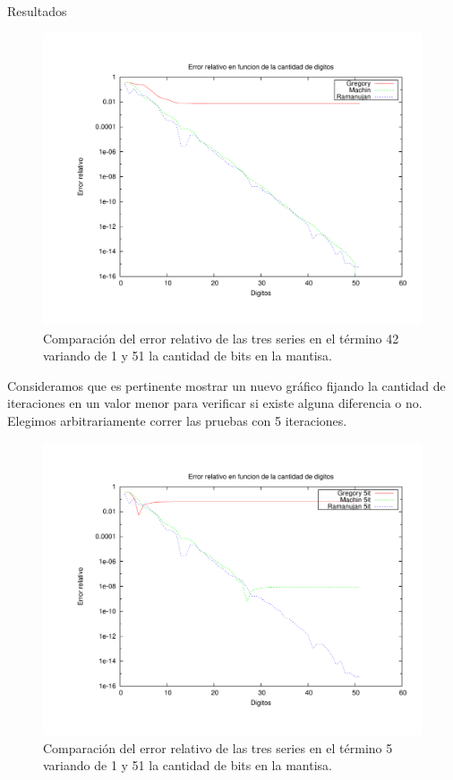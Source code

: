 \begin{section}{Resultados}
	\begin{figure}[H]
	  \centering
		\includegraphics[width=14cm]{graficos/comparacion_42it_1a51p.pdf}
	  \caption{Comparación del error relativo de las tres series en el término 42 variando de 1 y 51 la cantidad de bits en la mantisa.}
	  \label{fig:42it}
	\end{figure}
	
	Consideramos que es pertinente mostrar un nuevo gráfico fijando la cantidad de iteraciones en un valor menor para verificar si existe alguna diferencia o no. Elegimos arbitrariamente correr las pruebas con 5 iteraciones.
	
	\begin{figure}[H]
	  \centering
		\includegraphics[width=14cm]{graficos/comparacion_5it_1a51p.pdf}
	  \caption{Comparación del error relativo de las tres series en el término 5 variando de 1 y 51 la cantidad de bits en la mantisa.}
	  \label{fig:5it}
	\end{figure}
	

\end{section}
